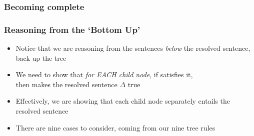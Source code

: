 \subsubsection{Becoming complete}

\begin{frame}
\frametitle{Reasoning from the `Bottom Up'}

\begin{itemize}[<+->]

\item Notice that we are reasoning from the sentences \textit{below} the resolved sentence, back up the tree

\item We need to show that \textit{for \emph{EACH} child node}, if  satisfies it, \\ then  makes the resolved sentence $\Delta$ true

\item Effectively, we are showing that each child node separately entails the resolved sentence

\item There are nine cases to consider, coming from our nine tree rules

\end{itemize}
\end{frame}




